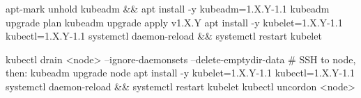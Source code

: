 \begin{minipage}[t]{0.48\linewidth}
\begin{cheatcodebash}
apt-mark unhold kubeadm && apt install -y kubeadm=1.X.Y-1.1
kubeadm upgrade plan
kubeadm upgrade apply v1.X.Y
apt install -y kubelet=1.X.Y-1.1 kubectl=1.X.Y-1.1
systemctl daemon-reload && systemctl restart kubelet

\end{cheatcodebash}

\end{minipage}\hfill
\begin{minipage}[t]{0.48\linewidth}


\begin{cheatcodebash}
kubectl drain <node> --ignore-daemonsets --delete-emptydir-data
# SSH to node, then:
kubeadm upgrade node
apt install -y kubelet=1.X.Y-1.1 kubectl=1.X.Y-1.1
systemctl daemon-reload && systemctl restart kubelet
kubectl uncordon <node>
\end{cheatcodebash}

\end{minipage}

